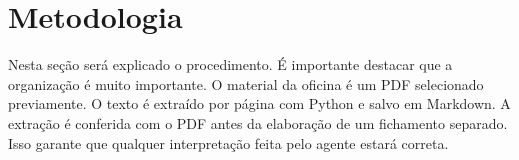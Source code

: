 \chapter{Metodologia}
Nesta seção será explicado o procedimento. É importante destacar que a organização é muito importante. O material da oficina é um PDF selecionado previamente. O texto é extraído por página com Python e salvo em Markdown. A extração é conferida com o PDF antes da elaboração de um fichamento separado. Isso garante que qualquer interpretação feita pelo agente estará correta.

